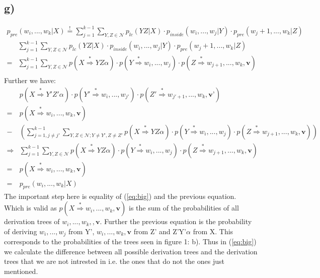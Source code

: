 \documentclass[a4paper,12pt]{ETHexercise}
\begin{document}
\subsection*{g)}
\begin{align*}
    p_{pre}(w_i,...,w_k|X) \stackrel{!}{=} \sum_{j=1}^{k-1}\sum_{Y,Z\in\mathcal{N}}p_{lc}(YZ|X)\cdot p_{inside}(w_i,...,w_j|Y)\cdot p_{pre}(w_j+1,...,w_k|Z)
\end{align*}
\begin{align}
    &\sum_{j=1}^{k-1}\sum_{Y,Z\in\mathcal{N}}p_{lc}(YZ|X)\cdot p_{inside}(w_i,...,w_j|Y)\cdot p_{pre}(w_j+1,...,w_k|Z)\\
    =&\sum_{j=1}^{k-1}\sum_{Y,Z\in\mathcal{N}}p(X \stackrel{*}{\Rightarrow} YZ\alpha)\cdot p(Y \stackrel{*}{\Rightarrow} w_i,...,w_j)\cdot p(Z \stackrel{*}{\Rightarrow} w_{j+1},...,w_k,\textbf{v})\\
\end{align}
Further we have:
\begin{align}
    &p(X \stackrel{*}{\Rightarrow} Y'Z'\alpha)\cdot p(Y' \stackrel{*}{\Rightarrow} w_i,...,w_{j'})\cdot p(Z' \stackrel{*}{\Rightarrow} w_{j'+1},...,w_k,\textbf{v'})\\
    = &p(X \stackrel{*}{\Rightarrow} w_i,...,w_k,\textbf{v}) \label{eq:big}\\
    - &\left( \sum_{j=1, j \neq j'}^{k-1}\sum_{Y,Z\in\mathcal{N}; Y\neq Y', Z \neq Z' }p(X \stackrel{*}{\Rightarrow} YZ\alpha)\cdot p(Y \stackrel{*}{\Rightarrow} w_i,...,w_j)\cdot p(Z \stackrel{*}{\Rightarrow} w_{j+1},...,w_k,\textbf{v}) \right) \\
    \Rightarrow &\sum_{j=1}^{k-1}\sum_{Y,Z\in\mathcal{N}}p(X \stackrel{*}{\Rightarrow} YZ\alpha)\cdot p(Y \stackrel{*}{\Rightarrow} w_i,...,w_j)\cdot p(Z \stackrel{*}{\Rightarrow} w_{j+1},...,w_k,\textbf{v})\\
    = &p(X \stackrel{*}{\Rightarrow} w_i,...,w_k,\textbf{v}) \\
    =&p_{pre}(w_i,...,w_k|X)
\end{align}
The important step here is equality of (\ref{eq:big}) and the previous equation. Which is valid as $p(X \stackrel{*}{\Rightarrow} w_i,...,w_k,\textbf{v})$ is the sum of the probabilities of all derivation trees of $w_i, ..., w_k,,\textbf{v} $. Further the previous equation is the probability of deriving $w_i,...,w_j$ from Y', $w_i,...,w_k,\textbf{v}$ from Z' and Z'Y'$\alpha$ from X. This corresponds to the probabilities of the trees seen in figure 1: b).  Thus in (\ref{eq:big}) we calculate the difference between all possible derivation trees and the derivation trees that we are not intrested in i.e. the ones that do not the ones just mentioned. 
\end{document}
